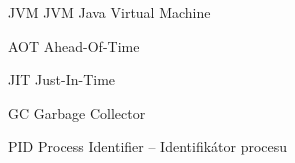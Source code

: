 \begin{seznamzkratek}{JVM}
		{JVM}
		{Java Virtual Machine}

		{AOT}
		{Ahead-Of-Time}

		{JIT}
		{Just-In-Time}
	
		{GC}
		{Garbage Collector}
	
		{PID}
		{Process Identifier -- Identifikátor procesu}
\end{seznamzkratek}
